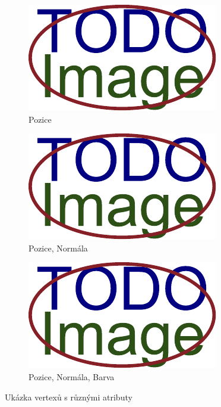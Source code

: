 \begin{figure}[H]
	\centering
	\begin{subfigure}{0.32\textwidth}
		\includegraphics[width=\textwidth]{obrazky-figures/placeholder.pdf}
		\caption{Pozice}
		\label{fig:opengl:vertex:p}
	\end{subfigure}
	\hfill
	\begin{subfigure}{0.32\textwidth}
		\includegraphics[width=\textwidth]{obrazky-figures/placeholder.pdf}
		\caption{Pozice, Normála}
		\label{fig:opengl:vertex:pn}
	\end{subfigure}
	\hfill
	\begin{subfigure}{0.32\textwidth}
		\includegraphics[width=\textwidth]{obrazky-figures/placeholder.pdf}
		\caption{Pozice, Normála, Barva}
		\label{fig:opengl:vertex:pnb}
	\end{subfigure}
	\caption{Ukázka vertexů s různými atributy}
	\label{fig:opengl:vertex}
\end{figure}

